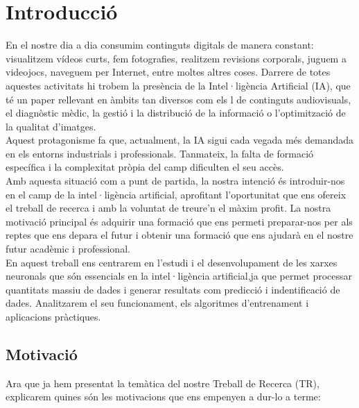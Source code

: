 \chapter{Introducció}
\label{c:intro}
En el nostre dia a dia consumim continguts digitals de manera constant: visualitzem vídeos curts, fem fotografies, realitzem revisions corporals, juguem a videojocs, naveguem per Internet, entre moltes altres coses. Darrere de totes aquestes activitats hi trobem la presència de la Intel·ligència Artificial (IA), que té un paper rellevant en àmbits tan diversos com els l de continguts audiovisuals, el diagnòstic mèdic, la gestió i la distribució de la informació o l’optimització de la qualitat d’imatges.\\

Aquest protagonisme fa que, actualment, la IA sigui cada vegada més demandada en els entorns industrials i professionals. Tanmateix, la falta de formació específica i la complexitat pròpia del camp dificulten el seu accès.\\

Amb aquesta situació com a punt de partida, la nostra intenció és introduir-nos en el camp de la intel·ligència artificial, aprofitant l’oportunitat que ens ofereix el treball de recerca i amb la voluntat de treure’n el màxim profit. La nostra motivació principal és adquirir una formació que ens permeti preparar-nos per als reptes que ens depara el futur i obtenir una formació que ens ajudarà en el nostre futur acadèmic i professional.\\

En aquest treball ens centrarem en l'estudi i el desenvolupament de les xarxes neuronals que són essencials en la intel·ligència artificial,ja que permet processar quantitats massiu de dades i generar resultats com predicció i indentificació de dades. Analitzarem el seu funcionament, els algoritmes d'entrenament i aplicacions pràctiques.




\section{Motivació}
Ara que ja hem presentat la temàtica del nostre Treball de Recerca (TR), explicarem quines són les motivacions que ens empenyen a dur-lo a terme:

